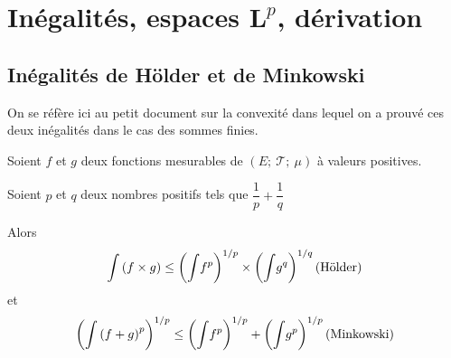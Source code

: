 \section{Inégalités, espaces $\mathbf L^p$, dérivation}

\subsection{Inégalités de Hölder et de Minkowski}

\label{holder}

On se réfère ici au petit document sur la convexité dans lequel on a prouvé ces deux inégalités dans le cas des sommes finies.

\begin{prop}
Soient $f$ et $g$ deux fonctions mesurables de $(E;~\mathcal{T};~\mu)$ à valeurs positives.

Soient $p$ et $q$ deux nombres positifs tels que $\dfrac{1}{p} + \dfrac{1}{q}$

Alors
\[
\displaystyle{\int} \left(f \times g\right) \leq \left(\displaystyle{\int} f^p\right)^{1/p} \times \left(\displaystyle{\int} g^q\right)^{1/q} \hfill \text{(Hölder)}
\]
et
\[
\left(\displaystyle{\int} \left(f + g\right)^p\right)^{1/p} \leq \left(\displaystyle{\int} f^p\right)^{1/p} + \left(\displaystyle{\int} g^p\right)^{1/p}
\hfill \text{(Minkowski)}
\]
\end{prop}

